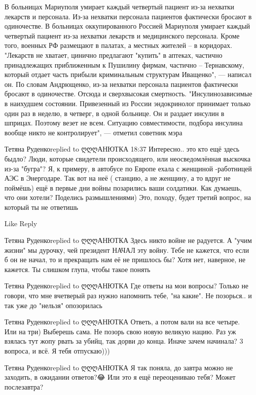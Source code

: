 {%

В больницах Мариуполя умирает каждый четвертый пациент из-за нехватки лекарств
и персонала. Из-за нехватки персонала пациентов фактически бросают в
одиночестве. В больницах оккупированного Россией Мариуполя умирает каждый
четвертый пациент из-за нехватки лекарств и медицинского персонала. Кроме того,
военных РФ размещают в палатах, а местных жителей – в коридорах. "Лекарств не
хватает, цинично предлагают "купить" в аптеках, частично принадлежащих
приближенным к Пушилину фирмам, частично – Тернавскому, который отдает часть
прибыли криминальным структурам Иващенко", — написал он. По словам Андрющенко,
из-за нехватки персонала пациентов фактически бросают в одиночестве. Отсюда и
сверхвысокая смертность. "Инсулинозависимые в наихудшем состоянии. Привезенный
из России эндокринолог принимает только один раз в неделю, в четверг, в одной
больнице. Он и раздает инсулин в шприцах. Поэтому везет не всем. Ситуацию
совместимости, подбора инсулина вообще никто не контролирует", — отметил
советник мэра

Тетяна Руденкоreplied to ღღღАНЮТКА
18:37
Интересно.. это кто ещё здесь быдло? Люди, которые свидетели происходящего, или неосведомлённая выскочка из-за "бугра"? Я, к примеру, в автобусе по Европе ехала с женщиной -работницей АЭС в Энергодаре. Так вот на неё ( станцию, а не женщину, а то вдруг не поймёшь) ещё в первые дни войны позарились ваши солдатики. Как думаешь, что они хотели? Поделись размышлениями) Это, походу, будет третий вопрос, на который ты не ответишь🤷

    Like
    Reply

Тетяна Руденкоreplied to ღღღАНЮТКА
Здесь никто войне не радуется. А "учим жизни" мы дурочку, чей президент НАЧАЛ эту войну. Тебе не кажется, что если б он не начал, то и прекращать нам её не пришлось бы? Хотя нет, наверное, не кажется. Ты слишком глупа, чтобы такое понять

Тетяна Руденкоreplied to ღღღАНЮТКА
Где ответы на мои вопросы? Только не говори, что мне вчетверый раз нужно напомнить тебе, "на какие". Не позорься.. и так уже до "нельзя" опозорилась

Тетяна Руденкоreplied to ღღღАНЮТКА
Ответь, а потом вали на все четыре. Или на три) Выберешь сама. Не позорь свою новую великую нацию. Раз уж взялась тут жопу рвать за убийц, так дорви до конца. Иначе зачем начинала? 3 вопроса, и всё. Я тебя отпускаю)))

Тетяна Руденкоreplied to ღღღАНЮТКА
Я так поняла, до завтра можно не заходить, в ожидании ответов?😂 Или это я ещё переоцениваю тебя? Может послезавтра?

}
